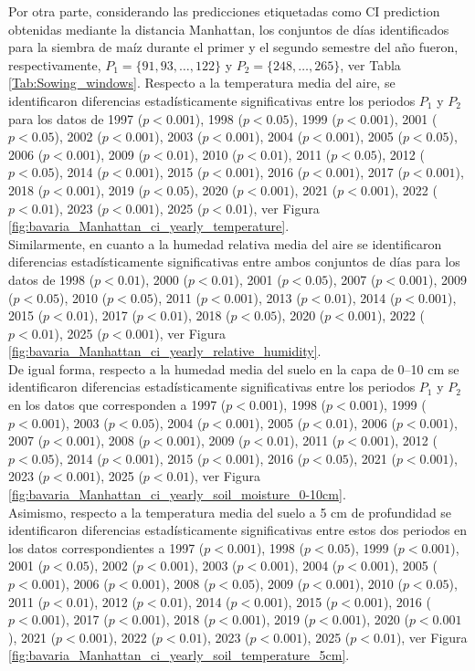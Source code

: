Por otra parte, considerando las predicciones etiquetadas como CI prediction obtenidas mediante la distancia Manhattan, los conjuntos de días identificados para la siembra de maíz durante el primer y el segundo semestre del año fueron, respectivamente, $P_1=\{91, 93,\ldots,122\}$ y $P_2=\{248,\ldots,265\}$, ver Tabla \ref{Tab:Sowing_windows}. Respecto a la temperatura media del aire, se identificaron diferencias estadísticamente significativas entre los periodos $P_1$ y $P_2$ para los datos de 1997	($p<0.001$), 1998	($p<0.05$), 1999	($p<0.001$), 2001	($p<0.05$), 2002	($p<0.001$), 2003	($p<0.001$), 2004	($p<0.001$), 2005	($p<0.05$), 2006	($p<0.001$), 2009	($p<0.01$), 2010	($p<0.01$), 2011	($p<0.05$), 2012	($p<0.05$), 2014	($p<0.001$), 2015	($p<0.001$), 2016	($p<0.001$), 2017	($p<0.001$), 2018	($p<0.001$), 2019	($p<0.05$), 2020	($p<0.001$), 2021	($p<0.001$), 2022	($p<0.01$), 2023	($p<0.001$), 2025	($p<0.01$), ver Figura \ref{fig:bavaria_Manhattan_ci_yearly_temperature}.\\

Similarmente, en cuanto a la humedad relativa media del aire se identificaron diferencias estadísticamente significativas entre ambos conjuntos de días para los datos de 1998	($p<0.01$), 2000	($p<0.01$), 2001	($p<0.05$), 2007	($p<0.001$), 2009	($p<0.05$), 2010	($p<0.05$), 2011	($p<0.001$), 2013	($p<0.01$), 2014	($p<0.001$), 2015	($p<0.01$), 2017	($p<0.01$), 2018	($p<0.05$), 2020	($p<0.001$), 2022	($p<0.01$), 2025	($p<0.001$), ver Figura \ref{fig:bavaria_Manhattan_ci_yearly_relative_humidity}.\\


De igual forma, respecto a la humedad media del suelo en la capa de 0--10 cm se identificaron diferencias estadísticamente significativas entre los periodos $P_1$ y $P_2$ en los datos que corresponden a 1997	($p<0.001$), 1998	($p<0.001$), 1999	($p<0.001$), 2003	($p<0.05$), 2004	($p<0.001$), 2005	($p<0.01$), 2006	($p<0.001$), 2007	($p<0.001$), 2008	($p<0.001$), 2009	($p<0.01$), 2011	($p<0.001$), 2012	($p<0.05$), 2014	($p<0.001$), 2015	($p<0.001$), 2016	($p<0.05$), 2021	($p<0.001$), 2023	($p<0.001$), 2025	($p<0.01$), ver Figura \ref{fig:bavaria_Manhattan_ci_yearly_soil_moisture_0-10cm}.\\

Asimismo, respecto a la temperatura media del suelo a 5 cm de profundidad se identificaron diferencias estadísticamente significativas entre estos dos periodos en los datos correspondientes a 1997	($p<0.001$), 1998	($p<0.05$), 1999	($p<0.001$), 2001	($p<0.05$), 2002	($p<0.001$), 2003	($p<0.001$), 2004	($p<0.001$), 2005	($p<0.001$), 2006	($p<0.001$), 2008	($p<0.05$), 2009	($p<0.001$), 2010	($p<0.05$), 2011	($p<0.01$), 2012	($p<0.01$), 2014	($p<0.001$), 2015	($p<0.001$), 2016	($p<0.001$), 2017	($p<0.001$), 2018	($p<0.001$), 2019	($p<0.001$), 2020	($p<0.001$), 2021	($p<0.001$), 2022	($p<0.01$), 2023	($p<0.001$), 2025	($p<0.01$), ver Figura \ref{fig:bavaria_Manhattan_ci_yearly_soil_temperature_5cm}.\\

